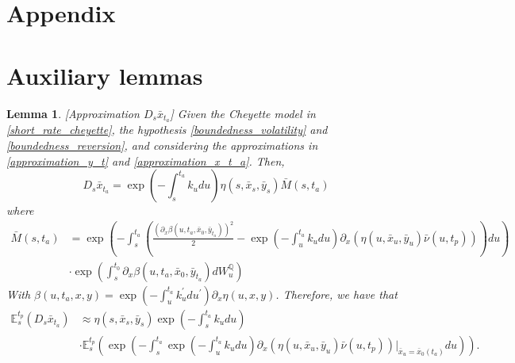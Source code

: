 \documentclass[a4paper,10pt]{article}
\newtheorem{lemma}[theorem]{Lemma}
\newcommand{\1}{\mathbf{1}}
\begin{document}
\section*{Appendix}
\appendix
\renewcommand{\thesection}{\Alph{section}.\arabic{section}}




\section{Auxiliary lemmas}
\begin{lemma}\label{DsX}[Approximation $D_s \bar{x}_{t_a}$]
Given the Cheyette model in \eqref{short_rate_cheyette}, the hypothesis \ref{boundedness_volatility} and \ref{boundedness_reversion}, and considering the approximations in \eqref{approximation_y_t} and \eqref{approximation_x_t_a}. Then, 
\begin{equation}\label{approximation_D_s_x_t}
D_s \bar{x}_{t_a} = \exp\left(-\int_{s}^{t_a}k_u du \right) \eta(s,\bar{x}_s,\bar{y}_s)\bar{M}(s,t_a)
\end{equation}
where
\begin{align*}
\bar{M}(s,t_a) &= \exp\left(-\int_{s}^{t_a} \left( \frac{\left(\partial_x \beta(u,t_a,\bar{x}_0,\bar{y}_{t_a})\right)^{2}}{2} - \exp\left(-\int_{u}^{t_a}k_u du\right) \partial_x (\eta(u, \bar{x}_u, \bar{y}_{u}) \bar{\nu}(u,t_p))\right) du \right) \\ 
&\cdot\exp\left(\int_{s}^{t_0} \partial_x \beta(u,t_a,\bar{x}_0,\bar{y}_{t_a}) dW^{\mathbb{Q}}_u \right)
\end{align*}
With $\beta(u,t_a,x,y) = \exp\left(-\int_{u}^{t_a}k_u^{\prime} du^{\prime}\right) \partial_x \eta(u,x,y)$. Therefore, we have that
\begin{align}\label{approsimation_E_s_x_t}
\mathbb{E}_s^{t_p}\left(D_s \bar{x}_{t_a}\right) &\approx \eta(s,\bar{x}_s,\bar{y}_s) \exp\left(-\int_{s}^{t_a}k_u du \right) \nonumber  \\
&\cdot \mathbb{E}^{t_p}_s\left(\exp\left(-\int_{s}^{t_a} \exp\left(-\int_{u}^{t_a}k_u du\right)\partial_x (\eta(u, \bar{x}_u, \bar{y}_{u}) \bar{\nu}(u,t_p))|_{\bar{x}_u=\bar{x}_0(t_a)} du \right)\right).
\end{align}
\end{lemma}
\end{document}

